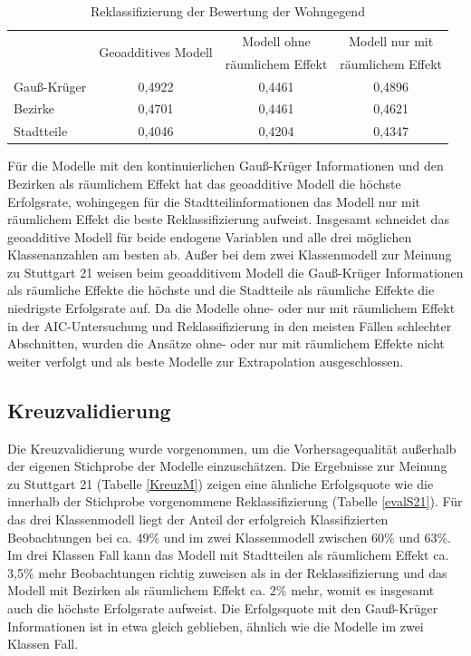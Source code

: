 \documentclass{Vorlage}
\begin{document}
\begin{table}[h]
\centering
\caption{Reklassifizierung der Bewertung der Wohngegend}
\label{evalB}
\begin{tabular}{l|c|c|c}
\hline \hline
             & \multirow{2}{*}{Geoadditives Modell} & Modell ohne       & Modell nur mit    \\
             &                                      & räumlichem Effekt & räumlichem Effekt \\ \hline
Gauß-Krüger & 0,4922                               & 0,4461            & 0,4896            \\
Bezirke      & 0,4701                               & 0,4461            & 0,4621            \\
Stadtteile   & 0,4046                               & 0,4204            & 0,4347            \\ \hline \hline
\end{tabular}
\end{table}

Für die Modelle mit den kontinuierlichen Gauß-Krüger Informationen und den Bezirken als räumlichem Effekt hat das geoadditive Modell die höchste Erfolgsrate, wohingegen für die Stadtteilinformationen das Modell nur mit räumlichem Effekt die beste Reklassifizierung aufweist. Insgesamt schneidet das geoadditive Modell für beide endogene Variablen und alle drei möglichen Klassenanzahlen am besten ab. Außer bei dem zwei Klassenmodell zur Meinung zu Stuttgart 21 weisen beim geoadditivem Modell die Gauß-Krüger Informationen als räumliche Effekte die höchste und die Stadtteile als räumliche Effekte die niedrigste Erfolgsrate auf. Da die Modelle ohne- oder nur mit räumlichem Effekt in der AIC-Untersuchung und Reklassifizierung in den meisten Fällen schlechter Abschnitten, wurden die Ansätze ohne- oder nur mit räumlichem Effekte nicht weiter verfolgt und als beste Modelle zur Extrapolation ausgeschlossen.

\subsection{Kreuzvalidierung}

Die Kreuzvalidierung wurde vorgenommen, um die Vorhersagequalität außerhalb der eigenen Stichprobe der Modelle einzuschätzen. Die Ergebnisse zur Meinung zu Stuttgart 21 (Tabelle \ref{KreuzM}) zeigen eine ähnliche Erfolgsquote wie die innerhalb der Stichprobe vorgenommene Reklassifizierung (Tabelle \ref{evalS21}). Für das drei Klassenmodell liegt der Anteil der erfolgreich Klassifizierten Beobachtungen bei ca. 49\% und im zwei Klassenmodell zwischen 60\% und 63\%. Im drei Klassen Fall kann das Modell mit Stadtteilen als räumlichem Effekt ca. 3,5\%  mehr Beobachtungen richtig zuweisen als in der Reklassifizierung und das Modell mit Bezirken als räumlichem Effekt ca. 2\% mehr, womit es insgesamt auch die höchste Erfolgsrate aufweist. Die Erfolgsquote mit den Gauß-Krüger Informationen ist in etwa gleich geblieben, ähnlich wie die Modelle im zwei Klassen Fall.
 
\end{document}
